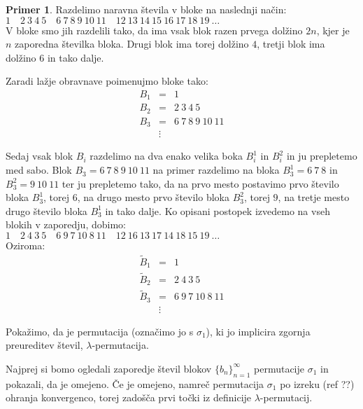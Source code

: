 \documentclass[12pt,a4paper,reqno]{amsart}
\theoremstyle{definition} %
\newtheorem{primer}[definicija]{Primer}
\theoremstyle{plain} %
\begin{document}
\begin{primer}
Razdelimo naravna števila v bloke na naslednji način:\\

$1 \quad 2\: 3\: 4\: 5 \quad 6\: 7\: 8\: 9\: 10\: 11 \quad 12\: 13\: 14\: 15\: 16\: 17\: 18\: 19\: \ldots $\\

V bloke smo jih razdelili tako, da ima vsak blok razen prvega dolžino $2n$, kjer je $n$ zaporedna številka bloka. Drugi blok ima torej dolžino $4$, tretji blok ima dolžino $6$ in tako dalje.

Zaradi lažje obravnave poimenujmo bloke tako:
\begin{eqnarray*}
B_1&=& 1\\
B_2&=& 2\: 3\: 4\: 5\\
B_3&=& 6\: 7\: 8\: 9\: 10\: 11\\
&\vdots &
\end{eqnarray*}

Sedaj vsak blok $B_i$ razdelimo na dva enako velika boka $B_i^1$ in $B_i^2$ in ju prepletemo med sabo. Blok $B_3=6\: 7\: 8\: 9\: 10\: 11$ na primer razdelimo na bloka $B_3^1=6\: 7\: 8$ in $B_3^2=9\: 10\: 11$ ter ju prepletemo tako, da na prvo mesto postavimo prvo število bloka $B_3^1$, torej $6$, na drugo mesto prvo število bloka $B_3^2$, torej $9$, na tretje mesto drugo število bloka $B_3^1$ in tako dalje. Ko opisani postopek izvedemo na vseh blokih v zaporedju, dobimo:\\ 

$1 \quad 2\: 4\: 3\: 5 \quad 6\: 9\: 7\: 10\: 8\: 11 \quad 12\: 16\: 13\: 17\: 14\: 18\: 15\: 19\: \ldots $\\

Oziroma:
\begin{eqnarray*}
\tilde{B}_1&=& 1\\
\tilde{B}_2&=& 2\: 4\: 3\: 5\\
\tilde{B}_3&=& 6\: 9\: 7\: 10\: 8\: 11\\
&\vdots &
\end{eqnarray*}

Pokažimo, da je permutacija (označimo jo s $\sigma_1$), ki jo implicira zgornja preureditev števil, $\lambda$-permutacija.

Najprej si bomo ogledali zaporedje števil blokov $\{b_n\}_{n=1}^{\infty}$ permutacije $\sigma_1$ in pokazali, da je omejeno. Če je omejeno, namreč permutacija $\sigma_1$ po izreku (ref ??) ohranja konvergenco, torej zadošča prvi točki iz definicije $\lambda$-permutacij. 


\end{primer}
\end{document}

